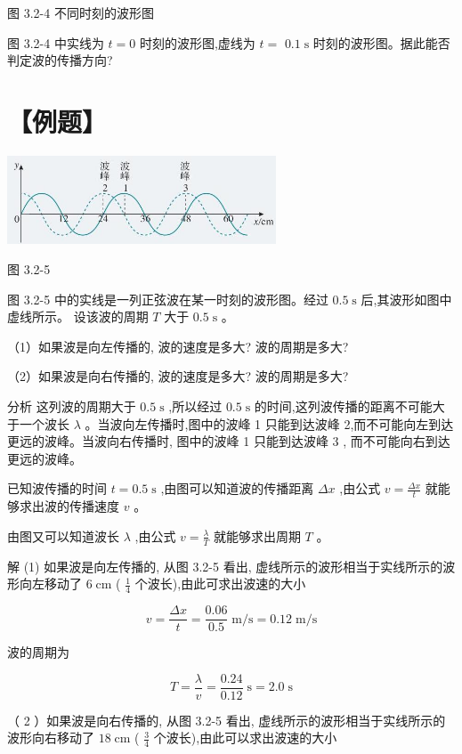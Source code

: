 \documentclass[10pt]{article}
\begin{document}
图 3.2-4 不同时刻的波形图

图 3.2-4 中实线为 \(t = 0\) 时刻的波形图,虚线为 \(t =\) \({0.1}\mathrm{\;s}\) 时刻的波形图。据此能否判定波的传播方向?

\section*{【例题】}

\begin{center}
\includegraphics[max width=0.6\textwidth]{images/01910e4c-ebb8-7d2c-8f2f-2375bc1d2d12_74_291623.jpg}
\end{center}

图 3.2-5

图 3.2-5 中的实线是一列正弦波在某一时刻的波形图。经过 \({0.5}\mathrm{\;s}\) 后,其波形如图中虚线所示。 设该波的周期 \(T\) 大于 \({0.5}\mathrm{\;s}\) 。

（1）如果波是向左传播的, 波的速度是多大? 波的周期是多大?

（2）如果波是向右传播的, 波的速度是多大? 波的周期是多大?

分析 这列波的周期大于 \({0.5}\mathrm{\;s}\) ,所以经过 \({0.5}\mathrm{\;s}\) 的时间,这列波传播的距离不可能大于一个波长 \(\lambda\) 。当波向左传播时,图中的波峰 1 只能到达波峰 2,而不可能向左到达更远的波峰。当波向右传播时, 图中的波峰 1 只能到达波峰 3 , 而不可能向右到达更远的波峰。

已知波传播的时间 \(t = {0.5}\mathrm{\;s}\) ,由图可以知道波的传播距离 \({\Delta x}\) ,由公式 \(v = \frac{\Delta x}{t}\) 就能够求出波的传播速度 \(v\) 。

由图又可以知道波长 \(\lambda\) ,由公式 \(v = \frac{\lambda }{T}\) 就能够求出周期 \(T\) 。

解 (1) 如果波是向左传播的, 从图 3.2-5 看出, 虚线所示的波形相当于实线所示的波形向左移动了 \(6\mathrm{\;{cm}}\) ( \(\frac{1}{4}\) 个波长),由此可求出波速的大小

\[
v = \frac{\Delta x}{t} = \frac{0.06}{0.5}\mathrm{\;m}/\mathrm{s} = {0.12}\mathrm{\;m}/\mathrm{s}
\]

波的周期为

\[
T = \frac{\lambda }{v} = \frac{0.24}{0.12}\mathrm{\;s} = {2.0}\mathrm{\;s}
\]

（ 2 ）如果波是向右传播的, 从图 3.2-5 看出, 虚线所示的波形相当于实线所示的波形向右移动了 \({18}\mathrm{\;{cm}}\) ( \(\frac{3}{4}\) 个波长),由此可以求出波速的大小
\end{document}
